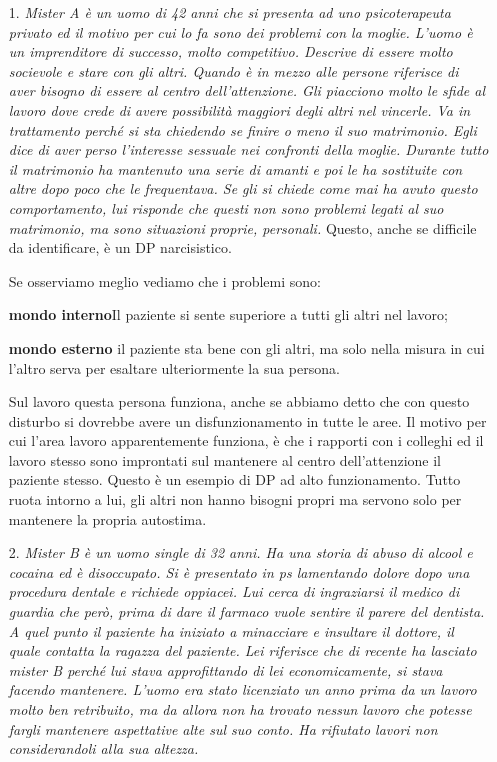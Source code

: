 \begin{itemize}
\item[1.]
  \emph{Mister A è un uomo di 42 anni che si presenta ad uno
  psicoterapeuta privato ed il motivo per cui lo fa sono dei problemi
  con la moglie. L'uomo è un imprenditore di successo, molto
  competitivo. Descrive di essere molto socievole e stare con gli altri.
  Quando è in mezzo alle persone riferisce di aver bisogno di essere al
  centro dell'attenzione. Gli piacciono molto le sfide al lavoro dove
  crede di avere possibilità maggiori degli altri nel vincerle. Va in
  trattamento perché si sta chiedendo se finire o meno il suo
  matrimonio. Egli dice di aver perso l'interesse sessuale nei confronti
  della moglie. Durante tutto il matrimonio ha mantenuto una serie di
  amanti e poi le ha sostituite con altre dopo poco che le frequentava.
  Se gli si chiede come mai ha avuto questo comportamento, lui risponde
  che questi non sono problemi legati al suo matrimonio, ma sono
  situazioni proprie, personali.} Questo, anche se difficile da
  identificare, è un DP narcisistico.

Se osserviamo meglio vediamo che i problemi sono:

\textbf{mondo interno}Il paziente si sente superiore a tutti gli altri
nel lavoro;

\textbf{mondo esterno} il paziente sta bene con gli altri, ma solo nella
misura in cui l'altro serva per esaltare ulteriormente la sua persona.

Sul lavoro questa persona funziona, anche se abbiamo detto che con
questo disturbo si dovrebbe avere un disfunzionamento in tutte le aree.
Il motivo per cui l'area lavoro apparentemente funziona, è che i
rapporti con i colleghi ed il lavoro stesso sono improntati sul
mantenere al centro dell'attenzione il paziente stesso. Questo è un
esempio di DP ad alto funzionamento. Tutto ruota intorno a lui, gli
altri non hanno bisogni propri ma servono solo per mantenere la propria
autostima.

\item[2.]
  \emph{Mister B è un uomo single di 32 anni. Ha una storia di abuso di
  alcool e cocaina ed è disoccupato. Si è presentato in ps lamentando
  dolore dopo una procedura dentale e richiede oppiacei. Lui cerca di
  ingraziarsi il medico di guardia che però, prima di dare il farmaco
  vuole sentire il parere del dentista. A quel punto il paziente ha
  iniziato a minacciare e insultare il dottore, il quale contatta la
  ragazza del paziente. Lei riferisce che di recente ha lasciato mister
  B perché lui stava approfittando di lei economicamente, si stava
  facendo mantenere. L'uomo era stato licenziato un anno prima da un
  lavoro molto ben retribuito, ma da allora non ha trovato nessun lavoro
  che potesse fargli mantenere aspettative alte sul suo conto. Ha
  rifiutato lavori non considerandoli alla sua altezza.}


\end{itemize}
